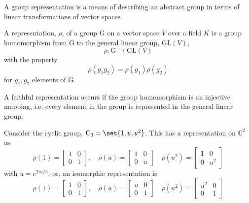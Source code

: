 A group representation is a means of describing an abstract group in
terms of linear transformations of vector spaces.
\begin{definition}
  A representation, $\rho$, of a group $\mathrm{G}$ on a vector space
  $V$ over a field $K$ is a group homomorphism from $\mathrm{G}$ to
  the general linear group, $\mathrm{GL}(V)$, \[ \rho : \mathrm{G} \to
  \mathrm{GL}(V) \] with the property \[ \rho(g_1 g_2) = \rho(g_1)
  \rho(g_2) \] for $g_1, g_2$ elements of $\mathrm{G}$.
\end{definition}
\begin{definition}
  A faithful representation occurs if the group homomorphism is an
  injective mapping, i.e. every element in the group is represented in
  the general linear group.
\end{definition}
\begin{example}
  Consider the cyclic group, $\group{C_3}=\set{1, u, u^2}$. This has a
  representation on $\mathbb{C}^2$ as
\[ \rho(1) = \begin{bmatrix}1&0\\0&1\end{bmatrix}, \quad \rho(u) =
\begin{bmatrix}
  1 & 0 \\ 0 & u
\end{bmatrix} \quad
\rho(u^2) =
\begin{bmatrix}
  1 & 0 \\ 0 & u^2
\end{bmatrix}
\]
with $u = e^{2 \pi i / 3}$, or, an isomorphic representation is
\[ \rho(1) = \begin{bmatrix}1&0\\0&1\end{bmatrix}, \quad \rho(u) =
\begin{bmatrix}
  u & 0 \\ 0 & 1
\end{bmatrix} \quad
\rho(u^2) =
\begin{bmatrix}
  u^2 & 0 \\ 0 & 1
\end{bmatrix}
\]
\end{example}

